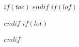 $if(toc)$
{
\setcounter{tocdepth}{$toc-depth$}
\tableofcontents
}
\clearpage
$endif$
$if(lof)$
\listoffigures
\clearpage
$endif$
$if(lot)$
\listoftables
\clearpage
$endif$
